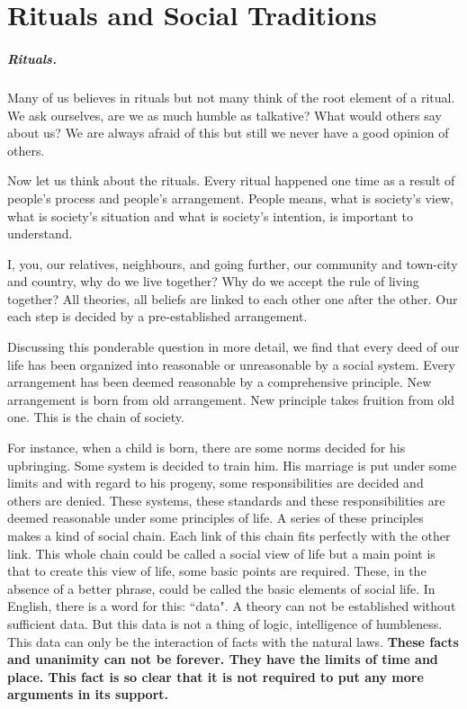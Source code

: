 \chapter{Rituals and Social Traditions}

\paragraph{Rituals.} Many of us believes in rituals but not many think of the
root element of a ritual. We ask ourselves, are we as much humble as
talkative? What would others say about us? We are always afraid of this but
still we never have a good opinion of others.

Now let us think about the rituals. Every ritual happened one time as a result
of people's process and people's arrangement. People means, what is society's
view, what is society's situation and what is society's intention, is important
to understand.

I, you, our relatives, neighbours, and going further, our community and
town-city and country, why do we live together? Why do we accept the rule of
living together? All theories, all beliefs are linked to each other one after
the other. Our each step is decided by a pre-established arrangement.

Discussing this ponderable question in more detail, we find that every deed of
our life has been organized into reasonable or unreasonable by a social system.
Every arrangement has been deemed reasonable by a comprehensive principle. New
arrangement is born from old arrangement. New principle takes fruition from old
one. This is the chain of society. 

For instance, when a child is born, there are some norms decided for his
upbringing. Some system is decided to train him. His marriage is put under some
limits and with regard to his progeny, some responsibilities are decided and
others are denied. These systems, these standards and these responsibilities are
deemed reasonable under some principles of life. A series of these principles
makes a kind of social chain. Each link of this chain fits perfectly with the
other link. This whole chain could be called a social view of life but a main
point is that to create this view of life, some basic points are required.
These, in the absence of a better phrase, could be called the basic elements of
social life. In English, there is a word for this: ``data". A theory can not be
established without sufficient data. But this data is not a thing of logic,
intelligence of humbleness. This data can only be the interaction of facts with
the natural laws. \textbf{These facts and unanimity can not be forever. They
have the limits of time and place. This fact is so clear that it is not required
to put any more arguments in its support.}

